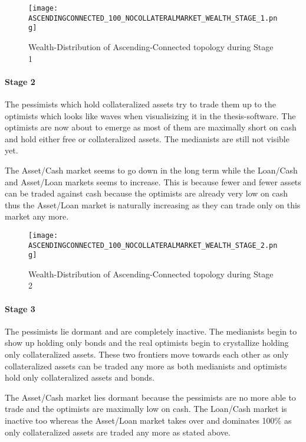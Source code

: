 \documentclass[Bachelorarbeit.tex]{subfiles}
\begin{document}
\begin{figure}[H]
	\centering
  \texttt{[image: ASCENDINGCONNECTED\_100\_NOCOLLATERALMARKET\_WEALTH\_STAGE\_1.png]}
  	\caption{Wealth-Distribution of Ascending-Connected topology during Stage 1}
	\label{fig:markets_ASCENDINGCONNECTED_100_NOCOLLATERALMARKET_WEALTH_STAGE_1}
\end{figure}

\paragraph{Stage 2}
The pessimists which hold collateralized assets try to trade them up to the optimists which looks like waves when visualisizing it in the thesis-software. The optimists are now about to emerge as most of them are maximally short on cash and hold either free or collateralized assets. The medianists are still not visible yet.

\medskip
		
The Asset/Cash market seems to go down in the long term while the Loan/Cash and Asset/Loan markets seems to increase. This is because fewer and fewer assets can be traded against cash because the optimists are already very low on cash thus the Asset/Loan market is naturally increasing as they can trade only on this market any more.
		
\begin{figure}[H]
	\centering
  \texttt{[image: ASCENDINGCONNECTED\_100\_NOCOLLATERALMARKET\_WEALTH\_STAGE\_2.png]}
  	\caption{Wealth-Distribution of Ascending-Connected topology during Stage 2}
	\label{fig:markets_ASCENDINGCONNECTED_100_NOCOLLATERALMARKET_WEALTH_STAGE_2}
\end{figure}
		
\paragraph{Stage 3}
The pessimists lie dormant and are completely inactive. The medianists begin to show up holding only bonds and the real optimists begin to crystallize holding only collateralized assets. These two frontiers move towards each other as only collateralized assets can be traded any more as both medianists and optimists hold only collateralized assets and bonds.

\medskip

The Asset/Cash market lies dormant because the pessimists are no more able to trade and the optimists are maximally low on cash. The Loan/Cash market is inactive too whereas the Asset/Loan market takes over and dominates 100\% as only collateralized assets are traded any more as stated above.
\end{document}
